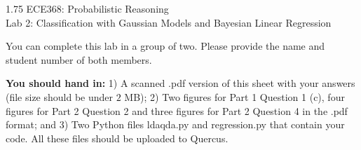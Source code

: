 \documentclass[twoside]{article}
\begin{document}
\begin{center}
\begin{spacing}{1.75}
{\Large { ECE368: Probabilistic Reasoning} \\
	{Lab 2: Classification with Gaussian Models and Bayesian Linear Regression}}
\end{spacing}
\vspace{-1em}
\end{center}
You can complete this lab in a group of two. Please provide the name and student number of both members.
\begin{center}
\end{center}
   
{\bf You should hand in:} 1) A scanned \textsf{.pdf} version of this sheet with your answers (file size
should be under $2$ MB); 2) Two figures for Part 1 Question 1 (c), four figures for Part 2 Question 2 and three figures for Part 2 Question 4
in the \textsf{.pdf} format; and 3) Two Python files \textsf{ldaqda.py} and \textsf{regression.py} that
contain your code. All these files should be uploaded to Quercus.
\end{document}
